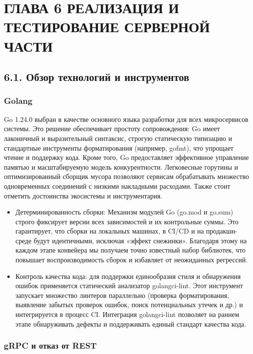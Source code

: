 \section{ГЛАВА 6 РЕАЛИЗАЦИЯ И ТЕСТИРОВАНИЕ СЕРВЕРНОЙ ЧАСТИ}

\subsection*{6.1. Обзор технологий и инструментов}

\subsubsection*{Golang}

Go 1.24.0 выбран в качестве основного языка разработки для всех микросервисов системы. Это решение обеспечивает простоту сопровождения: Go имеет лаконичный и выразительный синтаксис, строгую статическую типизацию и стандартные инструменты форматирования (например, gofmt), что упрощает чтение и поддержку кода. Кроме того, Go предоставляет эффективное управление памятью и масштабируемую модель конкурентности. Легковесные горутины и оптимизированный сборщик мусора позволяют сервисам обрабатывать множество одновременных соединений с низкими накладными расходами. Также стоит отметить достоинства экосистемы и инструментария.

\begin{itemize}
    \item Детерминированность сборки: Механизм модулей Go (go.mod и go.sum) строго фиксирует версии всех зависимостей и их контрольные суммы. Это гарантирует, что сборки на локальных машинах, в CI/CD и на продакшн-среде будут идентичными, исключая «эффект снежинки». Благодаря этому на каждом этапе конвейера мы получаем точно известный набор библиотек, что повышает воспроизводимость сборок и избавляет от неожиданных регрессий.
    \item Контроль качества кода: для поддержки единообразия стиля и обнаружения ошибок применяется статический анализатор golangci-lint. Этот инструмент запускает множество линтеров параллельно (проверка форматирования, выявление забытых проверок ошибок, поиск потенциальных утечек и др.) и интегрируется в процесс CI. Интеграция golangci-lint позволяет на раннем этапе обнаруживать дефекты и поддерживать единый стандарт качества кода.
\end{itemize}

\subsubsection*{gRPC и отказ от REST}

